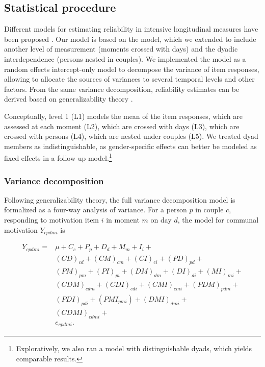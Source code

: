 \documentclass[jou,a4paper,draftfirst]{apa6}\usepackage[]{graphicx}\usepackage[]{color}
\begin{document}
\subsection{Statistical procedure}
Different models for estimating reliability in intensive longitudinal measures have been proposed \parencite{shrout_Psychometrics_2012,cranford_ProcedureEvaluatingSensitivity_2006,schoebi_coregulation_2008,nezlek_PracticalGuideUnderstanding_2016}. Our model is based on the \textcite{cranford_ProcedureEvaluatingSensitivity_2006} model, which we extended to include another level of measurement (moments crossed with days) and the dyadic interdependence (persons nested in couples). We implemented the model as a random effects intercept-only model to decompose the variance of item responses, allowing to allocate the sources of variances to several temporal levels and other factors. From the same variance decomposition, reliability estimates can be derived based on generalizability theory \parencite{cranford_ProcedureEvaluatingSensitivity_2006,shrout_Psychometrics_2012}.

Conceptually, level 1 (L1) models the mean of the item responses, which are assessed at each moment (L2), which are crossed with days (L3), which are crossed with persons (L4), which are nested under couples (L5). We treated dyad members as indistinguishable, as gender-specific effects can better be modeled as fixed effects in a follow-up model.\footnote{Exploratively, we also ran a model with distinguishable dyads, which yields comparable results.}




\subsubsection{Variance decomposition}
Following generalizability theory, the full variance decomposition model is formalized as a four-way analysis of variance. For a person $p$ in couple $c$, responding to motivation item $i$ in moment $m$ on day $d$, the model for communal motivation $Y_{cpdmi}$ is

\begin{equation}
\label{eq:GT}
\begin{split}
Y_{cpdmi} = &\mu + C_c + P_p + D_d + M_m + I_i +\\
					  &(CD)_{cd} + (CM)_{cm} + (CI)_{ci} + (PD)_{pd} + \\
					  &(PM)_{pm} + (PI)_{pi} + (DM)_{dm} + (DI)_{di} + (MI)_{mi} +  \\
					  &(CDM)_{cdm} + (CDI)_{cdi} + (CMI)_{cmi} + (PDM)_{pdm} + \\ 
					  &(PDI)_{pdi} + (PMI_{pmi}) + (DMI)_{dmi} + \\
					  &(CDMI)_{cdmi} + \\
					  &e_{cpdmi}.
\end{split}
\end{equation}
\end{document}
